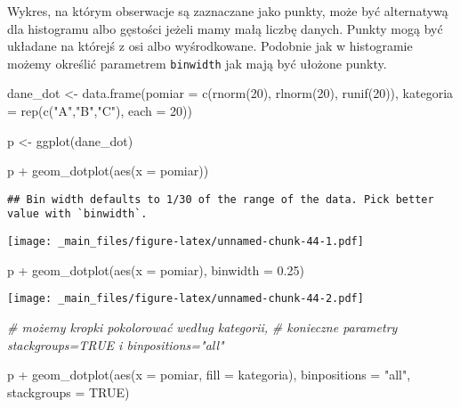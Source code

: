 \documentclass[
]{book}
\newenvironment{Shaded}{\begin{snugshade}}{\end{snugshade}}
\newcommand{\AttributeTok}[1]{\textcolor[rgb]{0.77,0.63,0.00}{#1}}
\newcommand{\CommentTok}[1]{\textcolor[rgb]{0.56,0.35,0.01}{\textit{#1}}}
\newcommand{\ConstantTok}[1]{\textcolor[rgb]{0.00,0.00,0.00}{#1}}
\newcommand{\DecValTok}[1]{\textcolor[rgb]{0.00,0.00,0.81}{#1}}
\newcommand{\FloatTok}[1]{\textcolor[rgb]{0.00,0.00,0.81}{#1}}
\newcommand{\FunctionTok}[1]{\textcolor[rgb]{0.00,0.00,0.00}{#1}}
\newcommand{\NormalTok}[1]{#1}
\newcommand{\OtherTok}[1]{\textcolor[rgb]{0.56,0.35,0.01}{#1}}
\newcommand{\SpecialCharTok}[1]{\textcolor[rgb]{0.00,0.00,0.00}{#1}}
\newcommand{\StringTok}[1]{\textcolor[rgb]{0.31,0.60,0.02}{#1}}
\begin{document}
Wykres, na którym obserwacje są zaznaczane jako punkty, może być alternatywą dla histogramu albo gęstości jeżeli mamy małą liczbę danych. Punkty mogą być układane na którejś z osi albo wyśrodkowane. Podobnie jak w histogramie możemy określić parametrem \texttt{binwidth} jak mają być ułożone punkty.

\begin{Shaded}
\begin{Highlighting}[]
\NormalTok{dane\_dot }\OtherTok{\textless{}{-}} \FunctionTok{data.frame}\NormalTok{(}\AttributeTok{pomiar =} \FunctionTok{c}\NormalTok{(}\FunctionTok{rnorm}\NormalTok{(}\DecValTok{20}\NormalTok{), }\FunctionTok{rlnorm}\NormalTok{(}\DecValTok{20}\NormalTok{), }\FunctionTok{runif}\NormalTok{(}\DecValTok{20}\NormalTok{)), }
                       \AttributeTok{kategoria =} \FunctionTok{rep}\NormalTok{(}\FunctionTok{c}\NormalTok{(}\StringTok{"A"}\NormalTok{,}\StringTok{"B"}\NormalTok{,}\StringTok{"C"}\NormalTok{), }\AttributeTok{each =} \DecValTok{20}\NormalTok{))}

\NormalTok{p }\OtherTok{\textless{}{-}} \FunctionTok{ggplot}\NormalTok{(dane\_dot)}

\NormalTok{p }\SpecialCharTok{+} \FunctionTok{geom\_dotplot}\NormalTok{(}\FunctionTok{aes}\NormalTok{(}\AttributeTok{x =}\NormalTok{ pomiar))}
\end{Highlighting}
\end{Shaded}

\begin{verbatim}
## Bin width defaults to 1/30 of the range of the data. Pick better value with `binwidth`.
\end{verbatim}

\texttt{[image: \_main\_files/figure-latex/unnamed-chunk-44-1.pdf]}

\begin{Shaded}
\begin{Highlighting}[]
\NormalTok{p }\SpecialCharTok{+} \FunctionTok{geom\_dotplot}\NormalTok{(}\FunctionTok{aes}\NormalTok{(}\AttributeTok{x =}\NormalTok{ pomiar), }\AttributeTok{binwidth =} \FloatTok{0.25}\NormalTok{)}
\end{Highlighting}
\end{Shaded}

\texttt{[image: \_main\_files/figure-latex/unnamed-chunk-44-2.pdf]}

\begin{Shaded}
\begin{Highlighting}[]
\CommentTok{\# możemy kropki pokolorować według kategorii, }
\CommentTok{\# konieczne parametry stackgroups=TRUE i binpositions="all"}

\NormalTok{p }\SpecialCharTok{+} \FunctionTok{geom\_dotplot}\NormalTok{(}\FunctionTok{aes}\NormalTok{(}\AttributeTok{x =}\NormalTok{ pomiar, }\AttributeTok{fill =}\NormalTok{ kategoria), }\AttributeTok{binpositions =} \StringTok{"all"}\NormalTok{, }\AttributeTok{stackgroups =} \ConstantTok{TRUE}\NormalTok{)}
\end{Highlighting}
\end{Shaded}
\end{document}

